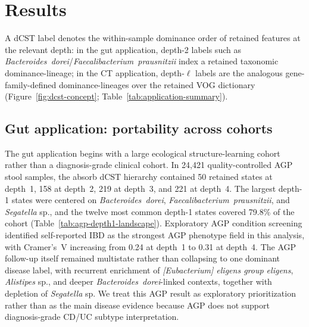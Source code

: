 \documentclass[11pt]{article}
\newcommand{\taxon}[1]{\emph{#1}}
\newcommand{\dcstsep}{/\allowbreak}
\begin{document}
\section{Results}

A dCST label denotes the within-sample dominance order of retained features at
the relevant depth: in the gut application, depth-2 labels such as
\taxon{Bacteroides~dorei}\dcstsep\taxon{Faecalibacterium~prausnitzii} index a
retained taxonomic dominance-lineage; in the CT application, depth-$\ell$
labels are the analogous gene-family-defined dominance-lineages over the
retained VOG dictionary
(Figure~\ref{fig:dcst-concept}; Table~\ref{tab:application-summary}).

\subsection{Gut application: portability across cohorts}

The gut application begins with a large ecological structure-learning cohort
rather than a diagnosis-grade clinical cohort. In 24,421 quality-controlled AGP
stool samples, the absorb dCST hierarchy contained 50 retained states at
depth~1, 158 at depth~2, 219 at depth~3, and 221 at depth~4. The largest
depth-1 states were centered on \taxon{Bacteroides~dorei},
\taxon{Faecalibacterium~prausnitzii}, and \taxon{Segatella} sp., and the twelve
most common depth-1 states covered 79.8\% of the cohort
(Table~\ref{tab:agp-depth1-landscape}). Exploratory AGP
condition screening identified self-reported IBD as the strongest AGP phenotype
field in this analysis, with Cramer's~V increasing from
0.24 at depth~1 to 0.31 at depth~4. The AGP follow-up itself remained
multistate rather than collapsing to one dominant disease label, with recurrent
enrichment of \taxon{[Eubacterium] eligens group eligens},
\taxon{Alistipes} sp., and deeper \taxon{Bacteroides~dorei}-linked contexts,
together with depletion of \taxon{Segatella} sp. We treat this AGP result as
exploratory prioritization rather than as the main disease evidence because AGP
does not support diagnosis-grade CD/UC subtype interpretation.
\end{document}
